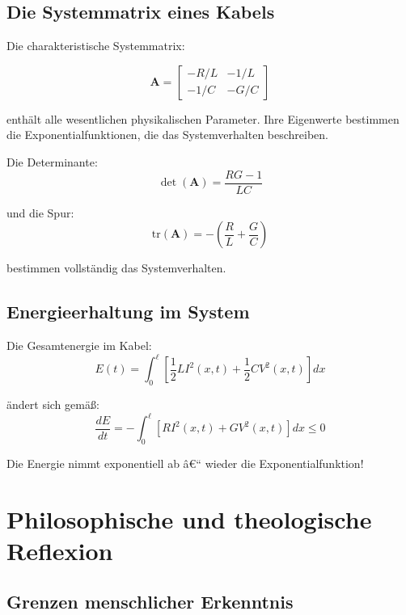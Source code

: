 ﻿\documentclass[12pt,a4paper]{article}
\theoremstyle{definition}
\theoremstyle{remark}
\begin{document}
\subsection{Die Systemmatrix eines Kabels}

Die charakteristische Systemmatrix:

\begin{equation}
\mathbf{A} = \begin{bmatrix} -R/L & -1/L \\ -1/C & -G/C \end{bmatrix}
\end{equation}

enthält alle wesentlichen physikalischen Parameter. Ihre Eigenwerte bestimmen die Exponentialfunktionen, die das Systemverhalten beschreiben.

Die Determinante:
\begin{equation}
\det(\mathbf{A}) = \frac{RG - 1}{LC}
\end{equation}

und die Spur:
\begin{equation}
\text{tr}(\mathbf{A}) = -\left(\frac{R}{L} + \frac{G}{C}\right)
\end{equation}

bestimmen vollständig das Systemverhalten.

\subsection{Energieerhaltung im System}

Die Gesamtenergie im Kabel:
\begin{equation}
E(t) = \int_0^\ell \left[\frac{1}{2}L I^2(x,t) + \frac{1}{2}C V^2(x,t)\right] dx
\end{equation}

ändert sich gemäß:
\begin{equation}
\frac{dE}{dt} = -\int_0^\ell \left[R I^2(x,t) + G V^2(x,t)\right] dx \leq 0
\end{equation}

Die Energie nimmt exponentiell ab â€“ wieder die Exponentialfunktion!

\section{Philosophische und theologische Reflexion}

\subsection{Grenzen menschlicher Erkenntnis}
\end{document}
